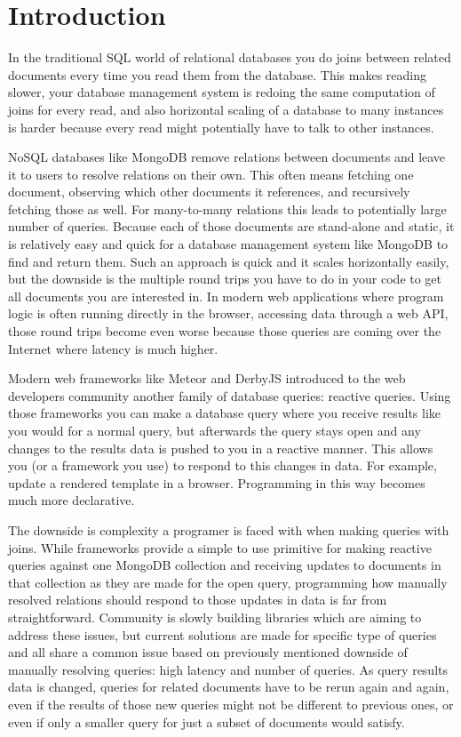 \section{Introduction}

In the traditional SQL world of relational databases you do joins between related documents every time you read them from the database.
This makes reading slower, your database management system is redoing the same computation of joins for every read, and also horizontal scaling of a database to many instances is harder because every read might potentially have to talk to other instances.

NoSQL databases like MongoDB remove relations between documents and leave it to users to resolve relations on their own.
This often means fetching one document, observing which other documents it references, and recursively fetching those as well.
For many-to-many relations this leads to potentially large number of queries.
Because each of those documents are stand-alone and static, it is relatively easy and quick for a database management system like MongoDB to find and return them.
Such an approach is quick and it scales horizontally easily, but the downside is the multiple round trips you have to do in your code to get all documents you are interested in.
In modern web applications where program logic is often running directly in the browser, accessing data through a web API, those round trips become even worse because those queries are coming over the Internet where latency is much higher.


Modern web frameworks like Meteor and DerbyJS introduced to the web developers community another family of database queries: reactive queries.
Using those frameworks you can make a database query where you receive results like you would for a normal query, but afterwards the query stays open and any changes to the results data is pushed to you in a reactive manner.
This allows you (or a framework you use) to respond to this changes in data.
For example, update a rendered template in a browser.
Programming in this way becomes much more declarative.

The downside is complexity a programer is faced with when making queries with joins.
While frameworks provide a simple to use primitive for making reactive queries against one MongoDB collection and receiving updates to documents in that collection as they are made for the open query, programming how manually resolved relations should respond to those updates in data is far from straightforward.
Community is slowly building libraries which are aiming to address these issues, but current solutions are made for specific type of queries and all share a common issue based on previously mentioned downside of manually resolving queries: high latency and number of queries.
As query results data is changed, queries for related documents have to be rerun again and again, even if the results of those new queries might not be different to previous ones, or even if only a smaller query for just a subset of documents would satisfy.

